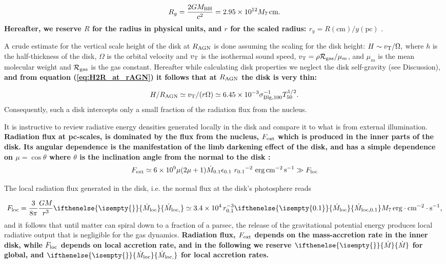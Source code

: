 \documentclass[12pt,english,preprint]{aastex}
\newcommand{\mybf}{\bf}
\newcommand{\su}[2]{#1_{\rm #2}}
\newcommand{\mdt}[1][]{ 
  \ifthenelse{\isempty{#1}}
  {\dot{M}_{\rm loc}}
  { {\dot M}_{\rm{loc},{#1}} } 
  } %
\newcommand{\Mdt}[1][]{ 
    \ifthenelse{\isempty{#1}}
    {\dot{M}_{}}
    { {\dot M}_{{#1}} } 
} %
\begin{document}
\begin{equation}
R_{g}=\frac{2GM_{{\rm BH}}}{c^{2}}=2.95\times10^{12}M_{7}\,{\rm cm.}\label{eq:RadSchwarz}
\end{equation}
{\mybf Hereafter, we reserve $R$ for the radius in physical units, and 
$r$ for the scaled radius: $r_y=R(\text{cm})/y(\text{pc})$ }. 

A crude estimate for the vertical scale height of the disk at $R_{{\rm AGN}}$
is done assuming the scaling for the disk height: $H\sim v_{{\rm T}}/\Omega,$
where $h$ is the half-thickness of the disk, $\Omega$ is the orbital
velocity and $v_{{\rm T}}$ is the isothermal sound speed, $v_{{\rm T}}=\rho\su{{\cal R}}{gas}/\mu_m$,
and $\mu_m$ is the mean molecular weight and $\su{{\cal R}}{gas}$ is the gas
constant. Hereafter while calculating disk properties
we neglect the disk self-gravity (see Discussion), {\mybf and 
from equation (\ref{eq:H2R_at_rAGN}) it follows that at $\su{R}{AGN}$ 
the disk is very thin:}

\begin{equation}
H/R_{\text{AGN}}\simeq v_{{\rm T}}/(r\Omega)\simeq6.45\times10^{-3}\sigma_{{\rm Blg,}100}^{-1}T_{50}^{1/2}.\label{eq:H2R_at_rAGN}
\end{equation}
 Consequently, such a disk intercepts only a small fraction
of the radiation flux from the nucleus. 

It is instructive to review
radiative energy densities generated locally in the disk and compare
it to what is from external illumination. 
{\mybf Radiation flux at pc-scales, is dominated by the flux from the nucleus, $\su{F}{ext}$
which is produced in the 
inner parts of the disk. Its
angular dependence is the manifestation of the limb darkening effect of the disk, and has a simple
dependence on $\mu=\cos\theta$ where $\theta$ is 
the inclination angle from the normal to the disk
\citep[i.e.][]{sobolevCourseTheoreticalAstrophysics1975, 
sunyaevComptonizationLowfrequencyRadiation1985}:
}
\begin{equation}
F_{{\rm ext}}\simeq6\times10^{9}\mu(2\mu+1){\dot{M}}_{0.1}\epsilon_{0.1}\ r_{0.1}{}^{-2}\,\,{\rm erg}{\rm \,cm^{-2}{\rm \,s^{-1}}}\gg F_{{\rm loc}}\label{eq:FluxAGNanisotr}
\end{equation}

The local radiation flux generated in the disk, i.e. the normal flux at the disk's photosphere reads

\begin{equation}
F_{{\rm loc}}=\frac{3}{8\pi}\frac{GM}{r^{3}}\mdt\simeq3.4\times10^{4}
\,r_{0.1}^{-3}\mdt[0.1] M_{7}{\rm \,erg}\cdot{\rm cm^{-2}}\cdot{\rm s}^{-1}\mbox{,}\label{eq:DiskLocFlux}
\end{equation}
and it follows that until matter can spiral down to a fraction of a parsec, the release of the
gravitational potential energy produces local radiative output that
is negligible for the gas dynamics. {\mybf Radiation flux, $\su{F}{ext}$ depends on the mass-accretion rate in the inner disk, 
while $F_{{\rm loc}}$ depends on local accretion rate, and in the following we reserve $\Mdt$ for global, and $\mdt$ for local 
accretion rates. }
\end{document}
